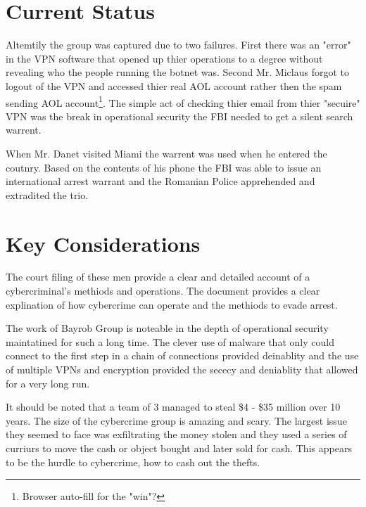 \documentclass[fleqn,12pt]{SelfArx} %
\begin{document}
\section*{Current Status} %
Altemtily the group was captured due to two failures.  First there was an "error" \cite{Cimpanu:ZD:Bayrob} in the VPN software that opened up thier operations to a degree without revealing who the people running the botnet was.  Second Mr. Miclaus forgot to logout of the VPN and accessed thier real AOL account rather then the spam sending AOL account\footnote{Browser auto-fill for the "win"?}.  The simple act of checking thier email from thier "secuire" VPN was the break in operational security the FBI needed to get a silent search warrent.  

When Mr. Danet visited Miami the warrent was used when he entered the coutnry.  Based on the contents of his phone the FBI was able to issue an international arrest warrant and the Romanian Police apprehended and extradited the trio. 

\section*{Key Considerations} %
The court filing of these men provide a clear and detailed account of a cybercriminal's methiods and operations. \cite{Gaughan:Court:Nicolescu}  The document provides a clear explination of how cybercrime can operate and the methiods to evade arrest.

The work of Bayrob Group is noteable in the depth of operational security maintatined for such a long time.  The clever use of malware that only could connect to the first step in a chain of connections provided deinablity and the use of multiple VPNs and encryption provided the sececy and deniablity that allowed for a very long run.

It should be noted that a team of 3 managed to steal \$4 - \$35 million over 10 years.  The size of the cybercrime group is amazing and scary.  The largest issue they seemed to face was exfiltrating the money stolen and they used a series of curriurs to move the cash or object bought and later sold for cash.  This appears to be the hurdle to cybercrime, how to cash out the thefts. 
\end{document}
